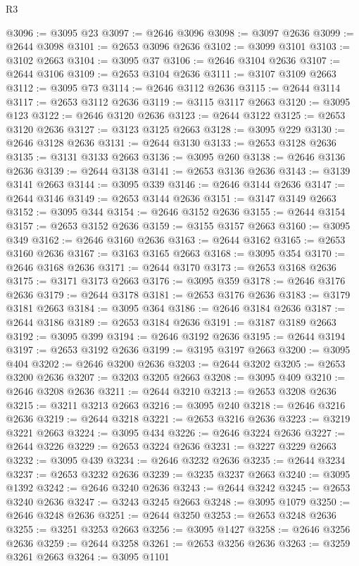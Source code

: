 \begin{lexlean}{R3}
\begin{coremodule}
@3096 := @3095 @23
@3097 := @2646 @3096
@3098 := @3097 @2636
@3099 := @2644 @3098
@3101 := @2653 @3096 @2636
@3102 := @3099 @3101
@3103 := @3102 @2663
@3104 := @3095 @37
@3106 := @2646 @3104 @2636
@3107 := @2644 @3106
@3109 := @2653 @3104 @2636
@3111 := @3107 @3109 @2663
@3112 := @3095 @73
@3114 := @2646 @3112 @2636
@3115 := @2644 @3114
@3117 := @2653 @3112 @2636
@3119 := @3115 @3117 @2663
@3120 := @3095 @123
@3122 := @2646 @3120 @2636
@3123 := @2644 @3122
@3125 := @2653 @3120 @2636
@3127 := @3123 @3125 @2663
@3128 := @3095 @229
@3130 := @2646 @3128 @2636
@3131 := @2644 @3130
@3133 := @2653 @3128 @2636
@3135 := @3131 @3133 @2663
@3136 := @3095 @260
@3138 := @2646 @3136 @2636
@3139 := @2644 @3138
@3141 := @2653 @3136 @2636
@3143 := @3139 @3141 @2663
@3144 := @3095 @339
@3146 := @2646 @3144 @2636
@3147 := @2644 @3146
@3149 := @2653 @3144 @2636
@3151 := @3147 @3149 @2663
@3152 := @3095 @344
@3154 := @2646 @3152 @2636
@3155 := @2644 @3154
@3157 := @2653 @3152 @2636
@3159 := @3155 @3157 @2663
@3160 := @3095 @349
@3162 := @2646 @3160 @2636
@3163 := @2644 @3162
@3165 := @2653 @3160 @2636
@3167 := @3163 @3165 @2663
@3168 := @3095 @354
@3170 := @2646 @3168 @2636
@3171 := @2644 @3170
@3173 := @2653 @3168 @2636
@3175 := @3171 @3173 @2663
@3176 := @3095 @359
@3178 := @2646 @3176 @2636
@3179 := @2644 @3178
@3181 := @2653 @3176 @2636
@3183 := @3179 @3181 @2663
@3184 := @3095 @364
@3186 := @2646 @3184 @2636
@3187 := @2644 @3186
@3189 := @2653 @3184 @2636
@3191 := @3187 @3189 @2663
@3192 := @3095 @399
@3194 := @2646 @3192 @2636
@3195 := @2644 @3194
@3197 := @2653 @3192 @2636
@3199 := @3195 @3197 @2663
@3200 := @3095 @404
@3202 := @2646 @3200 @2636
@3203 := @2644 @3202
@3205 := @2653 @3200 @2636
@3207 := @3203 @3205 @2663
@3208 := @3095 @409
@3210 := @2646 @3208 @2636
@3211 := @2644 @3210
@3213 := @2653 @3208 @2636
@3215 := @3211 @3213 @2663
@3216 := @3095 @240
@3218 := @2646 @3216 @2636
@3219 := @2644 @3218
@3221 := @2653 @3216 @2636
@3223 := @3219 @3221 @2663
@3224 := @3095 @434
@3226 := @2646 @3224 @2636
@3227 := @2644 @3226
@3229 := @2653 @3224 @2636
@3231 := @3227 @3229 @2663
@3232 := @3095 @439
@3234 := @2646 @3232 @2636
@3235 := @2644 @3234
@3237 := @2653 @3232 @2636
@3239 := @3235 @3237 @2663
@3240 := @3095 @1392
@3242 := @2646 @3240 @2636
@3243 := @2644 @3242
@3245 := @2653 @3240 @2636
@3247 := @3243 @3245 @2663
@3248 := @3095 @1079
@3250 := @2646 @3248 @2636
@3251 := @2644 @3250
@3253 := @2653 @3248 @2636
@3255 := @3251 @3253 @2663
@3256 := @3095 @1427
@3258 := @2646 @3256 @2636
@3259 := @2644 @3258
@3261 := @2653 @3256 @2636
@3263 := @3259 @3261 @2663
@3264 := @3095 @1101

\end{coremodule}
\end{lexlean}
